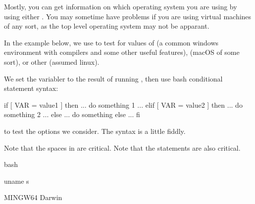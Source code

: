 \documentclass[letterpaper,10pt,english]{sphinxmanual}
\begin{document}
Mostly, you can get information on which operating system you are using by using either . You may sometime have problems if you are using virtual machines of any sort, as the top level operating system may not be apparant.

In the example below, we use  to test for values of  (a common windows environment with compilers and some other useful features),  (macOS of some sort), or other (assumed linux).

We set the variabler  to the result of running , then use bash conditional statement syntax:

\begin{sphinxVerbatim}[commandchars=\\\{\}]
if [ \PYGZdl{}VAR = value1 ]
then
  ... do something 1 ...
elif [ \PYGZdl{}VAR = value2 ]
then
  ... do something 2 ...
else
  ... do something else ...
fi
\end{sphinxVerbatim}

to test the options we consider. The syntax is a little fiddly.

Note that the spaces in  are critical. Note that the  statements are also critical.

{
\begin{sphinxVerbatim}[commandchars=\\\{\}]
\llap{\color{nbsphinxin}[18]:\,\hspace{\fboxrule}\hspace{\fboxsep}}\PYGZpc{}\PYGZpc{}bash

uname \PYGZhy{}s

 \PYG{o}{[}   MINGW64 \PYG{o}{]}
   
 \PYG{o}{[}   Darwin \PYG{o}{]}
   
   
\end{sphinxVerbatim}
}
\end{document}
